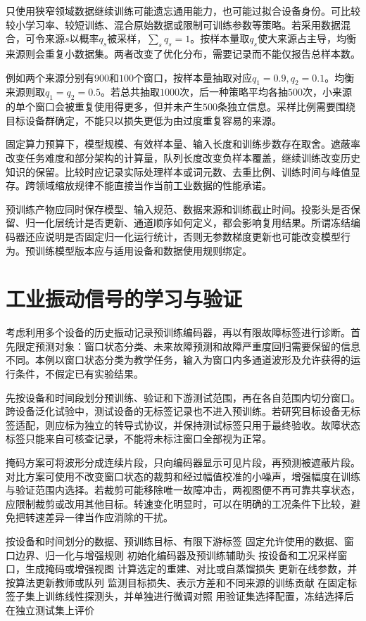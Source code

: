 只使用狭窄领域数据继续训练可能遗忘通用能力，也可能过拟合设备身份。可比较较小学习率、较短训练、混合原始数据或限制可训练参数等策略。若采用数据混合，可令来源$s$以概率$q_s$被采样，$\sum_sq_s=1$。按样本量取$q_s$使大来源占主导，均衡来源则会重复小数据集。两者改变了优化分布，需要记录而不能仅报告总样本数。

例如两个来源分别有$900$和$100$个窗口，按样本量抽取对应$q_1=0.9,q_2=0.1$。均衡来源则取$q_1=q_2=0.5$。若总共抽取$1000$次，后一种策略平均各抽$500$次，小来源的单个窗口会被重复使用得更多，但并未产生$500$条独立信息。采样比例需要围绕目标设备群确定，不能只以损失更低为由过度重复容易的来源。

固定算力预算下，模型规模、有效样本量、输入长度和训练步数存在取舍。遮蔽率改变任务难度和部分架构的计算量，队列长度改变负样本覆盖，继续训练改变历史知识的保留。比较时应记录实际处理样本或词元数、去重比例、训练时间与峰值显存。跨领域缩放规律不能直接当作当前工业数据的性能承诺。

预训练产物应同时保存模型、输入规范、数据来源和训练截止时间。投影头是否保留、归一化层统计是否更新、通道顺序如何定义，都会影响复用结果。所谓冻结编码器还应说明是否固定归一化运行统计，否则无参数梯度更新也可能改变模型行为。预训练模型版本应与适用设备和数据使用规则绑定。

\section{工业振动信号的学习与验证}
考虑利用多个设备的历史振动记录预训练编码器，再以有限故障标签进行诊断。首先限定预测对象：窗口状态分类、未来故障预测和故障严重度回归需要保留的信息不同。本例以窗口状态分类为教学任务，输入为窗口内多通道波形及允许获得的运行条件，不假定已有实验结果。

先按设备和时间段划分预训练、验证和下游测试范围，再在各自范围内切分窗口。跨设备泛化试验中，测试设备的无标签记录也不进入预训练。若研究目标设备无标签适配，则应标为独立的转导式协议，并保持测试标签只用于最终验收。故障状态标签只能来自可核查记录，不能将未标注窗口全部视为正常。

掩码方案可将波形分成连续片段，只向编码器显示可见片段，再预测被遮蔽片段。对比方案可使用不改变窗口状态的裁剪和经过幅值校准的小噪声，增强幅度在训练与验证范围内选择。若裁剪可能移除唯一故障冲击，两视图便不再可靠共享状态，应限制裁剪或改用其他目标。转速变化明显时，可以在明确的工况条件下比较，避免把转速差异一律当作应消除的干扰。

\begin{algorithm}[htbp]
\caption{工业信号预训练与下游表示评价}
\label{alg:industrial-pretraining}
\begin{algorithmic}[1]
\Require 按设备和时间划分的数据、预训练目标、有限下游标签
\State 固定允许使用的数据、窗口边界、归一化与增强规则
\State 初始化编码器及预训练辅助头
 \State 按设备和工况采样窗口，生成掩码或增强视图
 \State 计算选定的重建、对比或自蒸馏损失
 \State 更新在线参数，并按算法更新教师或队列
 \State 监测目标损失、表示方差和不同来源的训练贡献
\EndFor
\State 在固定标签子集上训练线性探测头，并单独进行微调对照
\State 用验证集选择配置，冻结选择后在独立测试集上评价
\end{algorithmic}
\end{algorithm}

